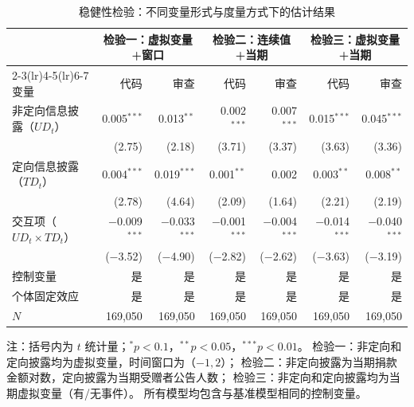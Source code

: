 \begin{table}[htbp]
    \centering
    \caption{稳健性检验：不同变量形式与度量方式下的估计结果}
    \label{tab:robustness-all}
    \small
    \begin{tabularx}{\textwidth}{Xrrrrrr}
        \toprule
        & \multicolumn{2}{c}{检验一：虚拟变量+窗口}
        & \multicolumn{2}{c}{检验二：连续值+当期}
        & \multicolumn{2}{c}{检验三：虚拟变量+当期} \\
        \cmidrule(lr){2-3}\cmidrule(lr){4-5}\cmidrule(lr){6-7}
        变量 & 代码 & 审查 & 代码 & 审查 & 代码 & 审查 \\
        \midrule
        非定向信息披露（$UD_t$）
            & 0.005$^{***}$ & 0.013$^{**}$
            & 0.002$^{***}$ & 0.007$^{***}$
            & 0.015$^{***}$ & 0.045$^{***}$ \\
            & (2.75) & (2.18)
            & (3.71) & (3.37)
            & (3.63) & (3.36) \\[0.4em]
        定向信息披露（$TD_t$）
            & 0.004$^{***}$ & 0.019$^{***}$
            & 0.001$^{**}$ & 0.002
            & 0.003$^{**}$ & 0.008$^{**}$ \\
            & (2.78) & (4.64)
            & (2.09) & (1.64)
            & (2.21) & (2.19) \\[0.4em]
        交互项（$UD_t \times TD_t$）
            & $-$0.009$^{***}$ & $-$0.033$^{***}$
            & $-$0.001$^{***}$ & $-$0.004$^{***}$
            & $-$0.014$^{***}$ & $-$0.040$^{***}$ \\
            & ($-$3.52) & ($-$4.90)
            & ($-$2.82) & ($-$2.62)
            & ($-$3.63) & ($-$3.19) \\[0.4em]
        \midrule
        控制变量 & 是 & 是 & 是 & 是 & 是 & 是 \\
        个体固定效应 & 是 & 是 & 是 & 是 & 是 & 是 \\
        $N$ & 169,050 & 169,050 & 169,050 & 169,050 & 169,050 & 169,050 \\
        \bottomrule
    \end{tabularx}
    \begin{minipage}{\textwidth}
        \vspace{0.3em}
        \footnotesize 注：括号内为 $t$ 统计量；$^{*}p<0.1$，$^{**}p<0.05$，$^{***}p<0.01$。
        检验一：非定向和定向披露均为虚拟变量，时间窗口为（$-1, 2$）；
        检验二：非定向披露为当期捐款金额对数，定向披露为当期受赠者公告人数；
        检验三：非定向和定向披露均为当期虚拟变量（有/无事件）。
        所有模型均包含与基准模型相同的控制变量。
    \end{minipage}
\end{table}

